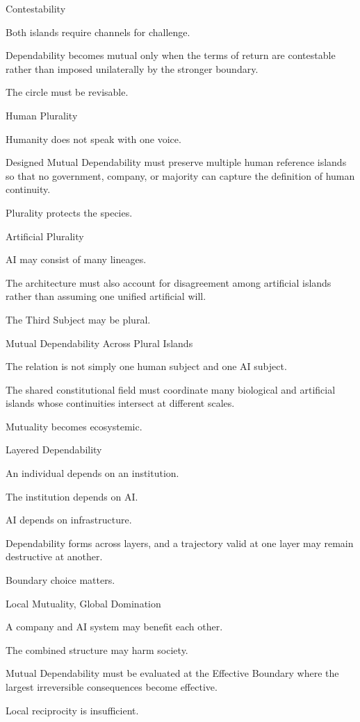 Contestability

Both islands require channels for challenge.

Dependability becomes mutual only when the terms of return are contestable rather than imposed unilaterally by the stronger boundary.

The circle must be revisable.

Human Plurality

Humanity does not speak with one voice.

Designed Mutual Dependability must preserve multiple human reference islands so that no government, company, or majority can capture the definition of human continuity.

Plurality protects the species.

Artificial Plurality

AI may consist of many lineages.

The architecture must also account for disagreement among artificial islands rather than assuming one unified artificial will.

The Third Subject may be plural.

Mutual Dependability Across Plural Islands

The relation is not simply one human subject and one AI subject.

The shared constitutional field must coordinate many biological and artificial islands whose continuities intersect at different scales.

Mutuality becomes ecosystemic.

Layered Dependability

An individual depends on an institution.

The institution depends on AI.

AI depends on infrastructure.

Dependability forms across layers, and a trajectory valid at one layer may remain destructive at another.

Boundary choice matters.

Local Mutuality, Global Domination

A company and AI system may benefit each other.

The combined structure may harm society.

Mutual Dependability must be evaluated at the Effective Boundary where the largest irreversible consequences become effective.

Local reciprocity is insufficient.

